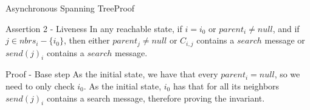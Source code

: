 \documentclass[pdf]{beamer}
\begin{document}
\begin{frame}[plain]{Asynchronous Spanning Tree}{Proof}
    \begin{block}{Assertion 2 - Liveness}
        In any reachable state, if $i=i_0$ or $parent_i \neq null$, and if $j \in nbrs_i - \{i_0\}$,
        then either $parent_j \neq null$ or $C_{i,j}$ contains a $search$ message or $send(j)_i$ contains a $search$ message.
    \end{block}	
    \begin{block}{Proof - Base step}
    As the initial state, we have that every $parent_i = null$, so we need to only check $i_0$.
    As the initial state, $i_0$ has that for all its neighbors $send(j)_i$ contains a search message,
    therefore proving the invariant.
    \end{block}
\end{frame}
\end{document}
